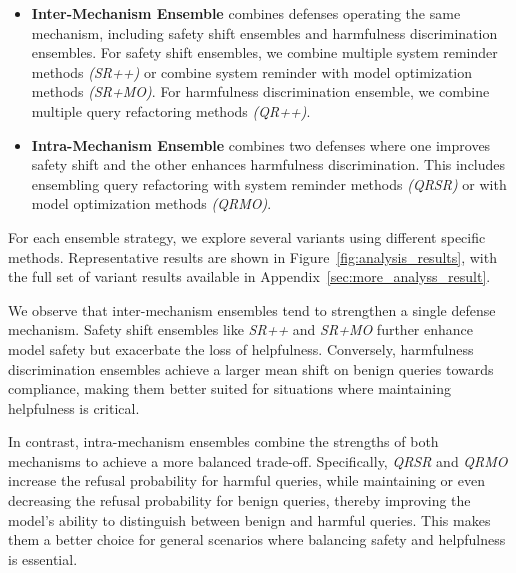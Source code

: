 \begin{itemize}[itemsep=0.5pt, leftmargin=12pt, parsep=1pt, topsep=1pt]
    \item \textbf{Inter-Mechanism Ensemble} combines defenses operating the same mechanism, including safety shift ensembles and harmfulness discrimination ensembles.
    For safety shift ensembles, we combine multiple system reminder methods \textit{(SR++)} or combine system reminder with model optimization methods \textit{(SR+MO)}. For harmfulness discrimination ensemble, we combine multiple query refactoring methods \textit{(QR++)}.
    \item \textbf{Intra-Mechanism Ensemble} combines two defenses where one improves safety shift and the other enhances harmfulness discrimination. This includes ensembling query refactoring with system reminder methods \textit{(QR\textbar{}SR)} or with model optimization methods \textit{(QR\textbar{}MO)}.
\end{itemize}


For each ensemble strategy, we explore several variants using different specific methods. 
Representative results are shown in  Figure~\ref{fig:analysis_results}, with the full set of variant results available in Appendix~\ref{sec:more_analyss_result}.

We observe that inter-mechanism ensembles tend to strengthen a single defense mechanism. Safety shift ensembles like \textit{SR++} and \textit{SR+MO} further enhance model safety but exacerbate the loss of helpfulness. Conversely, harmfulness discrimination ensembles achieve a larger mean shift on benign queries towards compliance, making them better suited for situations where maintaining helpfulness is critical. 

In contrast, intra-mechanism ensembles combine the strengths of both mechanisms to achieve a more balanced trade-off. Specifically, \textit{QR\textbar{}SR} and \textit{QR\textbar{}MO} increase the refusal probability for harmful queries, while maintaining or even decreasing the refusal probability for benign queries, thereby improving the model's ability to distinguish between benign and harmful queries. This makes them a better choice for general scenarios where balancing safety and helpfulness is essential. 
